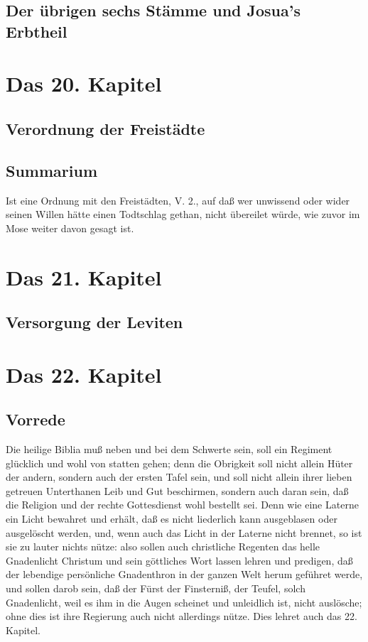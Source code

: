 \section{Der übrigen sechs Stämme und Josua's Erbtheil}
\chapter{Das 20. Kapitel}

\section{Verordnung der Freistädte}

\section{Summarium}

Ist eine Ordnung mit den Freistädten, V. 2., auf daß wer unwissend oder wider seinen Willen hätte einen Todtschlag gethan, nicht übereilet würde, wie zuvor im Mose weiter davon gesagt ist.

\chapter{Das 21. Kapitel}

\section{Versorgung der Leviten}
\chapter{Das 22. Kapitel}

\section{Vorrede}

Die heilige Biblia muß neben und bei dem Schwerte sein, soll ein Regiment glücklich und wohl von statten gehen; denn die Obrigkeit soll nicht allein Hüter der andern, sondern auch der ersten Tafel sein, und soll nicht allein ihrer lieben getreuen Unterthanen Leib und Gut beschirmen, sondern auch daran sein, daß die Religion und der rechte Gottesdienst wohl bestellt sei. Denn wie eine Laterne ein Licht bewahret und erhält, daß es nicht liederlich kann ausgeblasen oder ausgelöscht werden, und, wenn auch das Licht in der Laterne nicht brennet, so ist sie zu lauter nichts nütze: also sollen auch christliche Regenten das helle Gnadenlicht Christum und sein göttliches Wort lassen lehren und predigen, daß der lebendige persönliche Gnadenthron in der ganzen Welt herum geführet werde, und sollen darob sein, daß der Fürst der Finsterniß, der Teufel, solch Gnadenlicht, weil es ihm in die Augen scheinet und unleidlich ist, nicht auslösche; ohne dies ist ihre Regierung auch nicht allerdings nütze. Dies lehret auch das 22. Kapitel.

